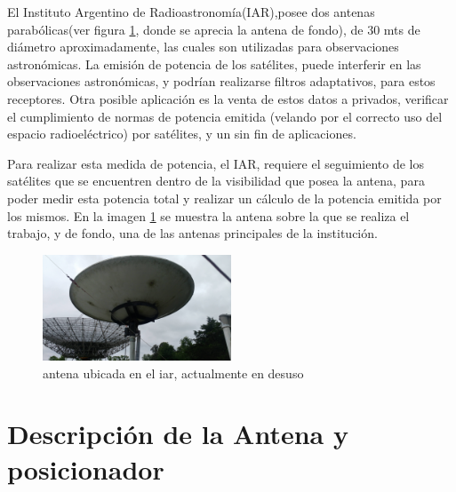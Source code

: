 El Instituto Argentino de Radioastronomía(IAR),posee dos antenas parabólicas(ver figura \ref{fig_antena}, donde se aprecia la antena de fondo), de 30 mts de diámetro aproximadamente, las cuales son utilizadas para observaciones astronómicas. La emisión de potencia de los satélites, puede interferir en las observaciones astronómicas, y podrían realizarse filtros adaptativos, para estos receptores. Otra posible aplicación es la venta de estos datos a privados, verificar el cumplimiento de normas de potencia emitida (velando por el correcto uso del espacio radioeléctrico) por satélites, y un sin fin de aplicaciones. 

Para realizar esta medida de potencia, el IAR, requiere el seguimiento de los satélites que se encuentren dentro de la visibilidad que posea la antena, para poder medir esta potencia total y realizar un cálculo de la potencia emitida por los mismos. En la imagen \ref{fig_antena} se muestra la antena sobre la que se realiza el trabajo, y de fondo, una de las antenas principales de la institución.   

\begin{figure}[h]
	\centering 
	\includegraphics[width=0.5\textwidth]{parte_1/cap1/antena}
	\caption{antena ubicada en el iar, actualmente en desuso}
	\label{fig_antena}
\end{figure}

\section{Descripción de la Antena y posicionador }

